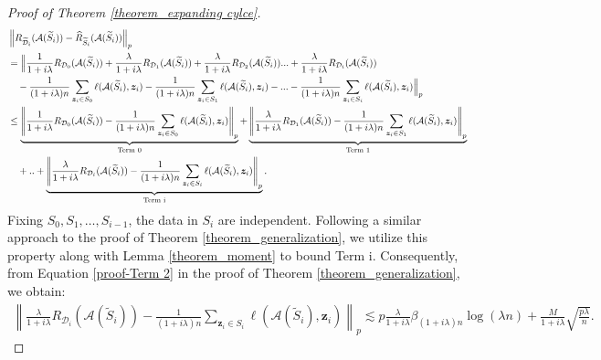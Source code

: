 \begin{proof}[Proof of Theorem \ref{theorem_expanding cylce}]
\begin{align}
&\left\|R_{\widetilde{\mathcal{D}}_i}(\mathcal{A}(\widetilde{S}_i))-\widehat{R}_{\widetilde{S}_i}(\mathcal{A}(\widetilde{S}_i))\right\|_{p} \notag \\
&=\Big\|\frac{1}{1+i\lambda} R_{\mathcal{D}_0}(\mathcal{A}(\widetilde{S}_i))+\frac{\lambda}{1+i\lambda}R_{\mathcal{D}_1}(\mathcal{A}(\widetilde{S}_i))+\frac{\lambda}{1+i\lambda}R_{\mathcal{D}_2}(\mathcal{A}(\widetilde{S}_i))...+\frac{\lambda}{1+i\lambda}R_{\mathcal{D}_i}(\mathcal{A}(\widetilde{S}_i))\notag \\
&\quad -\frac{1}{(1+i\lambda)n}\sum_{\boldsymbol{z}_{i}\in S_{0}}\ell(\mathcal{A}(\widetilde{S}_i),\boldsymbol{z}_{i})-\frac{1}{(1+i\lambda) n}\sum_{\boldsymbol{z}_{i}\in S_{1}}\ell(\mathcal{A}(\widetilde{S}_i),\boldsymbol{z}_{i})-...-\frac{1}{(1+i\lambda)n}\sum_{\boldsymbol{z}_{i}\in S_{i}}\ell(\mathcal{A}(\widetilde{S}_i),\boldsymbol{z}_{i})\Big\|_{p} \notag\\
&\leq \underbrace{\left\|\frac{1}{1+i\lambda} R_{\mathcal{D}_0}(\mathcal{A}(\widetilde{S}_i))-\frac{1}{(1+i\lambda)n}\sum_{\boldsymbol{z}_{i}\in S_{0}}\ell(\mathcal{A}(\widetilde{S}_i),\boldsymbol{z}_{i})\right\|_{p}}_{\text{Term 0}}+\underbrace{\left\|\frac{\lambda}{1+i\lambda}R_{\mathcal{D}_1}(\mathcal{A}(\widetilde{S}_i))-\frac{1}{(1+i\lambda)n}\sum_{\boldsymbol{z}_{i}\in S_{1}}\ell(\mathcal{A}(\widetilde{S}_i),\boldsymbol{z}_{i})\right\|_{p}}_{\text{Term 1}} \notag \\
&\quad+..+\underbrace{\left\|\frac{\lambda}{1+i\lambda} R_{\mathcal{D}_i}(\mathcal{A}(\widetilde{S}_i))-\frac{1}{(1+i\lambda)n}\sum_{\boldsymbol{z}_{i}\in S_{i}}\ell(\mathcal{A}(\widetilde{S}_i),\boldsymbol{z}_{i})\right\|_{p}}_{\text{Term i}}\label{proof-generalizati-decomp}.
\end{align}
Fixing $S_0, S_1, \dots, S_{i-1}$, the data in $S_i$ are independent. Following a similar approach to the proof of Theorem \ref{theorem_generalization}, we utilize this property along with Lemma \ref{theorem_moment} to bound Term i. Consequently, from Equation \ref{proof-Term 2} in the proof of Theorem \ref{theorem_generalization}, we obtain:
\begin{align}
    \left\|\frac{\lambda}{1+i\lambda}R_{\mathcal{D}_i}(\mathcal{A}(\widetilde{S}_i))-\frac{1}{(1+i\lambda )n}\sum_{\boldsymbol{z}_{i}\in S_{i}}\ell(\mathcal{A}(\widetilde{S}_i),\boldsymbol{z}_{i})\right\|_{p}\lesssim p \frac{\lambda}{1+i\lambda} \beta_{(1+i\lambda) n} \log (\lambda n)+\frac{M}{1+i\lambda} \sqrt{\frac{p\lambda}{n}} \label{proof4-Term i}.

\end{align}
\end{proof}

